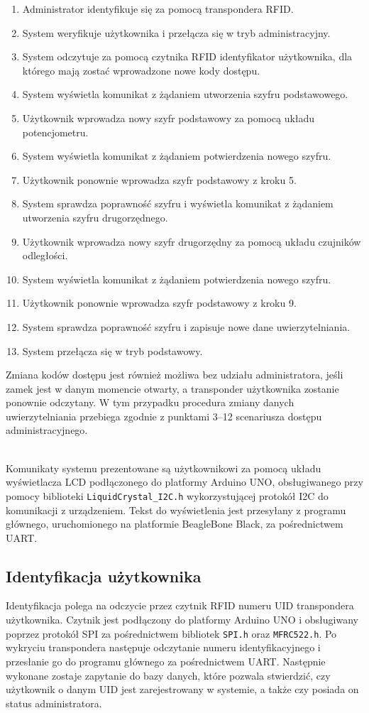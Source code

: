 \documentclass[polish,polish,a4paper]{article}
\begin{document}
	\begin{enumerate}
		\item Administrator identyfikuje się za pomocą transpondera RFID.
		\item System weryfikuje użytkownika i przełącza się w tryb administracyjny.
		\item System odczytuje za pomocą czytnika RFID identyfikator użytkownika, dla którego mają zostać wprowadzone nowe kody dostępu.
		\item System wyświetla komunikat z żądaniem utworzenia szyfru podstawowego.
		\item Użytkownik wprowadza nowy szyfr podstawowy za pomocą układu potencjometru.
		\item System wyświetla komunikat z żądaniem potwierdzenia nowego szyfru.
		\item Użytkownik ponownie wprowadza szyfr podstawowy z kroku 5.
		\item System sprawdza poprawność szyfru i wyświetla komunikat z żądaniem utworzenia szyfru drugorzędnego.
		\item Użytkownik wprowadza nowy szyfr drugorzędny za pomocą układu czujników odległości.
		\item System wyświetla komunikat z żądaniem potwierdzenia nowego szyfru.
		\item Użytkownik ponownie wprowadza szyfr podstawowy z kroku 9.
		\item System sprawdza poprawność szyfru i zapisuje nowe dane uwierzytelniania.
		\item System przełącza się w tryb podstawowy.
	\end{enumerate}
	Zmiana kodów dostępu jest również możliwa bez udziału administratora, jeśli zamek jest w danym momencie otwarty, a transponder użytkownika zostanie ponownie odczytany. W tym przypadku procedura zmiany danych uwierzytelniania przebiega zgodnie z punktami 3--12 scenariusza dostępu administracyjnego.
	
	\noindent\\
	Komunikaty systemu prezentowane są użytkownikowi za pomocą układu wyświetlacza LCD podłączonego do platformy Arduino UNO, obsługiwanego przy pomocy biblioteki \verb|LiquidCrystal_I2C.h| wykorzystującej protokół I2C do komunikacji z urządzeniem. Tekst do wyświetlenia jest przesyłany z programu głównego, uruchomionego na platformie BeagleBone Black, za pośrednictwem UART.
	
	\subsection{Identyfikacja użytkownika}
	Identyfikacja polega na odczycie przez czytnik RFID numeru UID transpondera użytkownika. Czytnik jest podłączony do platformy Arduino UNO i obsługiwany poprzez protokół SPI za pośrednictwem bibliotek \verb|SPI.h| oraz \verb|MFRC522.h|. Po wykryciu transpondera następuje odczytanie numeru identyfikacyjnego i przesłanie go do programu głównego za pośrednictwem UART. Następnie wykonane zostaje zapytanie do bazy danych, które pozwala stwierdzić, czy użytkownik o danym UID jest zarejestrowany w systemie, a także czy posiada on status administratora.
	
\end{document}
